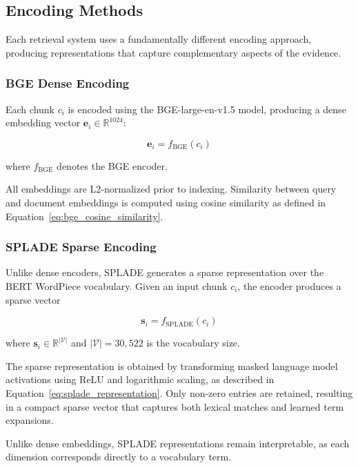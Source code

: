 \subsection{Encoding Methods}

Each retrieval system uses a fundamentally different encoding approach, producing representations that capture complementary aspects of the evidence.

\subsubsection{BGE Dense Encoding}

Each chunk $c_i$ is encoded using the BGE-large-en-v1.5 model, producing a dense embedding vector $\mathbf{e}_i \in \mathbb{R}^{1024}$:

\begin{equation}
\mathbf{e}_i = f_{\text{BGE}}(c_i)
\label{eq:bge_encoding}
\end{equation}

where $f_{\text{BGE}}$ denotes the BGE encoder.

All embeddings are L2-normalized prior to indexing. Similarity between query and document embeddings is computed using cosine similarity as defined in Equation~\ref{eq:bge_cosine_similarity}. 

\subsubsection{SPLADE Sparse Encoding}

Unlike dense encoders, SPLADE generates a sparse representation over the BERT WordPiece vocabulary. Given an input chunk $c_i$, the encoder produces a sparse vector

\begin{equation}
\mathbf{s}_i = f_{\text{SPLADE}}(c_i)
\label{eq:splade_encoding}
\end{equation}

where $\mathbf{s}_i \in \mathbb{R}^{|\mathcal{V}|}$ and $|\mathcal{V}|=30,522$ is the vocabulary size.

The sparse representation is obtained by transforming masked language model activations using ReLU and logarithmic scaling, as described in Equation~\ref{eq:splade_representation}. Only non-zero entries are retained, resulting in a compact sparse vector that captures both lexical matches and learned term expansions.

Unlike dense embeddings, SPLADE representations remain interpretable, as each dimension corresponds directly to a vocabulary term.

